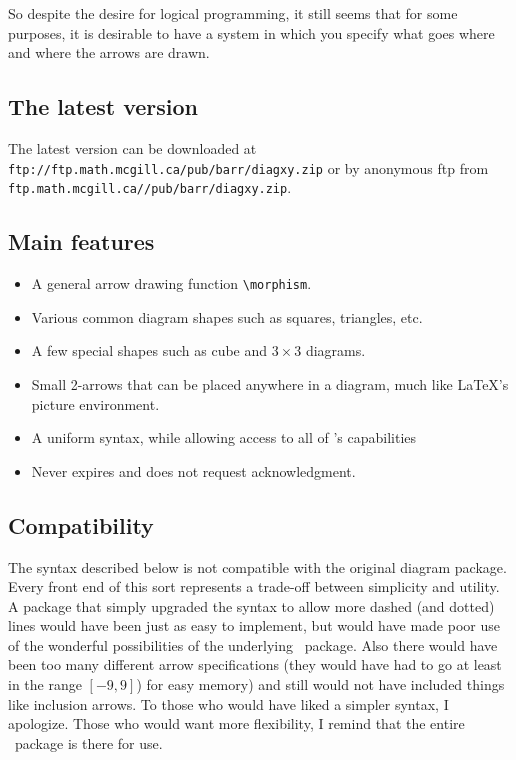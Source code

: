 \documentclass[12pt]{article}
\begin{document}
So despite the desire for logical programming, it still seems that for
some purposes, it is desirable to have a system in which you specify
what goes where and where the arrows are drawn.

\subsection{The latest version}
The latest version can be downloaded at
\verb,ftp://ftp.math.mcgill.ca/pub/barr/diagxy.zip, or by anonymous ftp
from \verb,ftp.math.mcgill.ca//pub/barr/diagxy.zip,.


\subsection{Main features}

\begin{itemize}
 \item A general arrow drawing function
\verb.\morphism..
 \item Various common diagram shapes such as squares, triangles, etc.
 \item A few special shapes such as cube and $3\times3$ diagrams.
 \item Small 2-arrows that can be placed anywhere in a diagram, much
like \LaTeX's
picture
 environment.
 \item A uniform syntax, while allowing access to all of \xypic's
capabilities
 \item Never expires and does not request acknowledgment.
\end{itemize}

\subsection{Compatibility}
The syntax described below is not compatible with the original diagram
package.  Every front end of this sort represents a trade-off between
simplicity and utility.  A package that simply upgraded the syntax to
allow more dashed (and dotted) lines would have been just as easy to
implement, but would have made poor use of the wonderful possibilities
of the underlying \xypic\ package.  Also there would have been too many
different arrow specifications (they would have had to go at least in
the range $[-9,9]$) for easy memory) and still would not have included
things like inclusion arrows.  To those who would have liked a simpler
syntax, I apologize.  Those who would want more flexibility, I remind
that the entire \xypic\ package is there for use.
\end{document}
